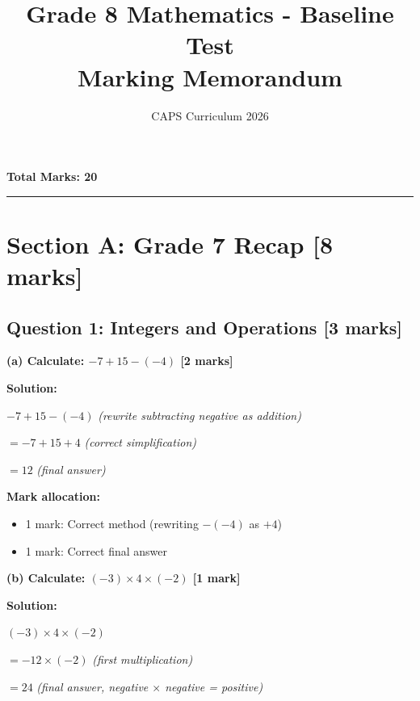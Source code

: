 \documentclass[12pt,a4paper]{article}
\title{\textbf{Grade 8 Mathematics - Baseline Test\\Marking Memorandum}}
\author{CAPS Curriculum 2026}
\date{}
\begin{document}
\maketitle

\vspace{0.5cm}
\noindent\textbf{Total Marks: 20}

\vspace{0.3cm}
\hrule
\vspace{0.5cm}

\section*{Section A: Grade 7 Recap [8 marks]}

\subsection*{Question 1: Integers and Operations [3 marks]}

\textbf{(a) Calculate: $-7 + 15 - (-4)$ \hfill [2 marks]}

\vspace{0.2cm}
\noindent\textbf{Solution:}

$-7 + 15 - (-4)$ \checkmark \quad \textit{(rewrite subtracting negative as addition)}

$= -7 + 15 + 4$ \checkmark \quad \textit{(correct simplification)}

$= 12$ \checkmark\checkmark \quad \textit{(final answer)}

\vspace{0.3cm}
\noindent\textbf{Mark allocation:}
\begin{itemize}
    \item 1 mark: Correct method (rewriting $-(-4)$ as $+4$)
    \item 1 mark: Correct final answer
\end{itemize}

\vspace{0.4cm}

\textbf{(b) Calculate: $(-3) \times 4 \times (-2)$ \hfill [1 mark]}

\vspace{0.2cm}
\noindent\textbf{Solution:}

$(-3) \times 4 \times (-2)$

$= -12 \times (-2)$ \checkmark \quad \textit{(first multiplication)}

$= 24$ \checkmark \quad \textit{(final answer, negative $\times$ negative = positive)}
\end{document}
